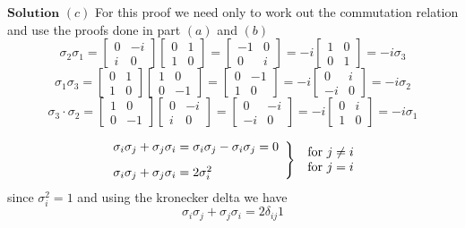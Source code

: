 $\boxed{\textbf{Solution}}$  $(c)$ For this proof we need only to work out the commutation relation and use the proofs done in part $(a)$ and $(b)$
$$\sigma_{2} \sigma_{1}=\begin{bmatrix}{0} & {-i} \\ {i} & {0}\end{bmatrix}\begin{bmatrix}{0} & {1} \\ {1} & {0}\end{bmatrix}=\begin{bmatrix}{-1} & {0} \\ {0} & {i}\end{bmatrix}=-i\begin{bmatrix}{1} & {0} \\ {0} & {1}\end{bmatrix} = -i\sigma_3$$
$$\sigma_{1} \sigma_{3}=\begin{bmatrix}{0} & {1} \\ {1} & {0}\end{bmatrix}\begin{bmatrix}{1} & {0} \\ {0} & {-1}\end{bmatrix}=\begin{bmatrix}{0} & {-1} \\ {1} & {0}\end{bmatrix}=-i\begin{bmatrix}{0} & {i} \\ {-i} & {0}\end{bmatrix}=-i \sigma_{2}$$
$$\sigma_{3} \cdot \sigma_{2}=\begin{bmatrix}{1} & {0} \\ {0} & {-1}\end{bmatrix}\begin{bmatrix}{0} & {-i} \\ {i} & {0}\end{bmatrix}=\begin{bmatrix}{0} & {-i} \\ {-i} & {0}\end{bmatrix}=-i\begin{bmatrix}{0} & {i} \\ {1} & {0}\end{bmatrix} = -i\sigma_1$$

$$\left.\begin{array}{l}{\sigma_{i} \sigma_{j}+\sigma_{j} \sigma_{i}=\sigma_{i} \sigma_{j}-\sigma_{i} \sigma_{j}=0} \vspace{3mm} \\ {\sigma_{i} \sigma_{j}+\sigma_{j} \sigma_{i}=2 \sigma_{i}^{2}}\end{array}\right\} \begin{array}{l}{\text { for } j \neq i} \\ {\text { for } j=i}\end{array}$$
since $\sigma_{i}^{2}=1$ and using the kronecker delta we have
$$\sigma_{i} \sigma_{j}+\sigma_{j} \sigma_{i}=2 \delta_{i j} 1$$


